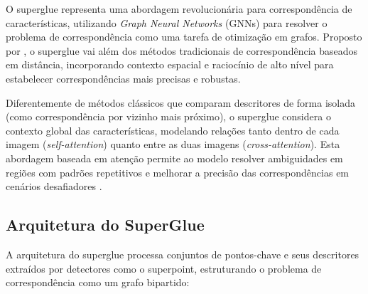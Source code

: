 O \gls{superglue} representa uma abordagem revolucionária para correspondência de características, utilizando \textit{Graph Neural Networks} (GNNs) para resolver o problema de correspondência como uma tarefa de otimização em grafos. Proposto por , o \gls{superglue} vai além dos métodos tradicionais de correspondência baseados em distância, incorporando contexto espacial e raciocínio de alto nível para estabelecer correspondências mais precisas e robustas.

Diferentemente de métodos clássicos que comparam descritores de forma isolada (como correspondência por vizinho mais próximo), o \gls{superglue} considera o contexto global das características, modelando relações tanto dentro de cada imagem (\textit{self-attention}) quanto entre as duas imagens (\textit{cross-attention}). Esta abordagem baseada em atenção permite ao modelo resolver ambiguidades em regiões com padrões repetitivos e melhorar a precisão das correspondências em cenários desafiadores \cite{Sarlin2020}.

\subsection*{Arquitetura do SuperGlue}

A arquitetura do \gls{superglue} processa conjuntos de pontos-chave e seus descritores extraídos por detectores como o \gls{superpoint}, estruturando o problema de correspondência como um grafo bipartido:

